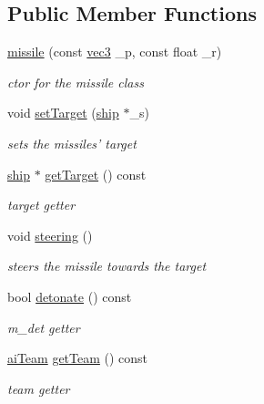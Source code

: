 \subsection*{Public Member Functions}
\begin{DoxyCompactItemize}
\item 
\hyperlink{classmissile_a00f844af2c364c08cea07168947b709f}{missile} (const \hyperlink{structvec3}{vec3} \-\_\-p, const float \-\_\-r)
\begin{DoxyCompactList}\small\item\em ctor for the missile class \end{DoxyCompactList}\item 
void \hyperlink{classmissile_adb3b3adc21ee110967d2b5fbbd871e48}{set\-Target} (\hyperlink{classship}{ship} $\ast$\-\_\-s)
\begin{DoxyCompactList}\small\item\em sets the missiles' target \end{DoxyCompactList}\item 
\hypertarget{classmissile_acf40e8fe2ddfa4f028991e400ddd5003}{\hyperlink{classship}{ship} $\ast$ \hyperlink{classmissile_acf40e8fe2ddfa4f028991e400ddd5003}{get\-Target} () const }\label{classmissile_acf40e8fe2ddfa4f028991e400ddd5003}

\begin{DoxyCompactList}\small\item\em target getter \end{DoxyCompactList}\item 
\hypertarget{classmissile_a39c26b0f5a5946e9e3b484751e53c822}{void \hyperlink{classmissile_a39c26b0f5a5946e9e3b484751e53c822}{steering} ()}\label{classmissile_a39c26b0f5a5946e9e3b484751e53c822}

\begin{DoxyCompactList}\small\item\em steers the missile towards the target \end{DoxyCompactList}\item 
\hypertarget{classmissile_a8362636924cb31035ec0f09015d88e83}{bool \hyperlink{classmissile_a8362636924cb31035ec0f09015d88e83}{detonate} () const }\label{classmissile_a8362636924cb31035ec0f09015d88e83}

\begin{DoxyCompactList}\small\item\em m\-\_\-det getter \end{DoxyCompactList}\item 
\hypertarget{classmissile_a0443abaaeaed7e6ec0eca854eba06c60}{\hyperlink{enemy_8hpp_abac1fdbabb5a6be5f0d6ae40be5c5a58}{ai\-Team} \hyperlink{classmissile_a0443abaaeaed7e6ec0eca854eba06c60}{get\-Team} () const }\label{classmissile_a0443abaaeaed7e6ec0eca854eba06c60}

\begin{DoxyCompactList}\small\item\em team getter \end{DoxyCompactList}\end{DoxyCompactItemize}


